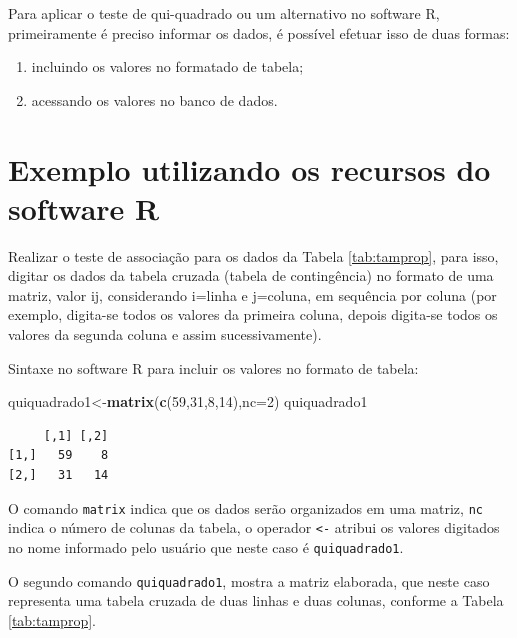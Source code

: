 \documentclass[12pt,brazil,oneside]{book}
\newenvironment{Shaded}{\begin{snugshade}}{\end{snugshade}}
\newcommand{\DataTypeTok}[1]{\textcolor[rgb]{0.13,0.29,0.53}{#1}}
\newcommand{\DecValTok}[1]{\textcolor[rgb]{0.00,0.00,0.81}{#1}}
\newcommand{\KeywordTok}[1]{\textcolor[rgb]{0.13,0.29,0.53}{\textbf{#1}}}
\newcommand{\NormalTok}[1]{#1}
\begin{document}
Para aplicar o teste de qui-quadrado ou um alternativo no software R, primeiramente é preciso informar os dados, é possível efetuar isso de duas formas:

\begin{enumerate}
\def\labelenumi{(\alph{enumi})}
\item
  incluindo os valores no formatado de tabela;
\item
  acessando os valores no banco de dados.
\end{enumerate}

\hypertarget{exemplo-utilizando-os-recursos-do-software-r}{%
\section{Exemplo utilizando os recursos do software R}\label{exemplo-utilizando-os-recursos-do-software-r}}

Realizar o teste de associação para os dados da Tabela \ref{tab:tamprop}, para isso, digitar os dados da tabela cruzada (tabela de contingência) no formato de uma matriz, valor ij, considerando i=linha e j=coluna, em sequência por coluna (por exemplo, digita-se todos os valores da primeira coluna, depois digita-se todos os valores da segunda coluna e assim sucessivamente).

Sintaxe no software R para incluir os valores no formato de tabela:

\begin{Shaded}
\begin{Highlighting}[]
\NormalTok{quiquadrado1<-}\KeywordTok{matrix}\NormalTok{(}\KeywordTok{c}\NormalTok{(}\DecValTok{59}\NormalTok{,}\DecValTok{31}\NormalTok{,}\DecValTok{8}\NormalTok{,}\DecValTok{14}\NormalTok{),}\DataTypeTok{nc=}\DecValTok{2}\NormalTok{)}
\NormalTok{quiquadrado1}
\end{Highlighting}
\end{Shaded}

\begin{verbatim}
     [,1] [,2]
[1,]   59    8
[2,]   31   14
\end{verbatim}

O comando \texttt{matrix} indica que os dados serão organizados em uma matriz, \texttt{nc} indica o número de colunas da tabela, o operador \texttt{\textless{}-} atribui os valores digitados no nome informado pelo usuário que neste caso é \texttt{quiquadrado1}.

O segundo comando \texttt{quiquadrado1}, mostra a matriz elaborada, que neste caso representa uma tabela cruzada de duas linhas e duas colunas, conforme a Tabela \ref{tab:tamprop}.
\end{document}
